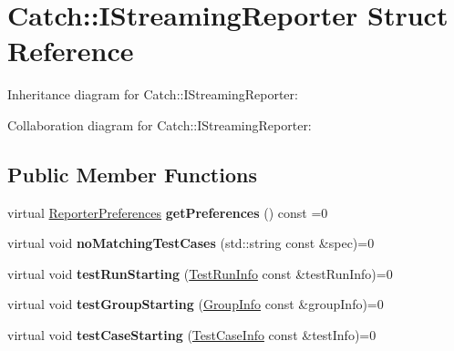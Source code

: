 \hypertarget{structCatch_1_1IStreamingReporter}{}\section{Catch\+:\+:I\+Streaming\+Reporter Struct Reference}
\label{structCatch_1_1IStreamingReporter}


Inheritance diagram for Catch\+:\+:I\+Streaming\+Reporter\+:


Collaboration diagram for Catch\+:\+:I\+Streaming\+Reporter\+:
\subsection*{Public Member Functions}
\begin{DoxyCompactItemize}
\item 
virtual \hyperlink{structCatch_1_1ReporterPreferences}{Reporter\+Preferences} {\bfseries get\+Preferences} () const =0\hypertarget{structCatch_1_1IStreamingReporter_a122d9136175aefb16ccc5d3b61f23711}{}\label{structCatch_1_1IStreamingReporter_a122d9136175aefb16ccc5d3b61f23711}

\item 
virtual void {\bfseries no\+Matching\+Test\+Cases} (std\+::string const \&spec)=0\hypertarget{structCatch_1_1IStreamingReporter_aaa0ea1d8250b48fafc8d36f86e6d1d80}{}\label{structCatch_1_1IStreamingReporter_aaa0ea1d8250b48fafc8d36f86e6d1d80}

\item 
virtual void {\bfseries test\+Run\+Starting} (\hyperlink{structCatch_1_1TestRunInfo}{Test\+Run\+Info} const \&test\+Run\+Info)=0\hypertarget{structCatch_1_1IStreamingReporter_a8c7b304d9563992a611dc7d68dc0c1ce}{}\label{structCatch_1_1IStreamingReporter_a8c7b304d9563992a611dc7d68dc0c1ce}

\item 
virtual void {\bfseries test\+Group\+Starting} (\hyperlink{structCatch_1_1GroupInfo}{Group\+Info} const \&group\+Info)=0\hypertarget{structCatch_1_1IStreamingReporter_aef40d16994fe8a7ab140c885d8c2d7d0}{}\label{structCatch_1_1IStreamingReporter_aef40d16994fe8a7ab140c885d8c2d7d0}

\item 
virtual void {\bfseries test\+Case\+Starting} (\hyperlink{structCatch_1_1TestCaseInfo}{Test\+Case\+Info} const \&test\+Info)=0\hypertarget{structCatch_1_1IStreamingReporter_a8f7270dc83853494a1c3a912ddf95a11}{}\label{structCatch_1_1IStreamingReporter_a8f7270dc83853494a1c3a912ddf95a11}


\end{DoxyCompactItemize}
